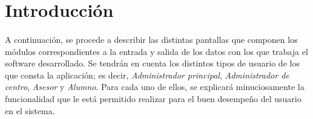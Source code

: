 \section{Introducción}

\paragraph{}A continuación, se procede a describir las distintas pantallas que
componen los módulos correspondientes a la entrada y salida de los datos con los
que trabaja el software desarrollado. Se tendrán en cuenta los distintos tipos
de usuario de los que consta la aplicación; es decir, \textit{Administrador
principal}, \textit{Administrador de centro}, \textit{Asesor} y \textit{Alumno}.
Para cada uno de ellos, se explicará minuciosamente la funcionalidad que le está
permitido realizar para el buen desempeño del usuario en el sistema.